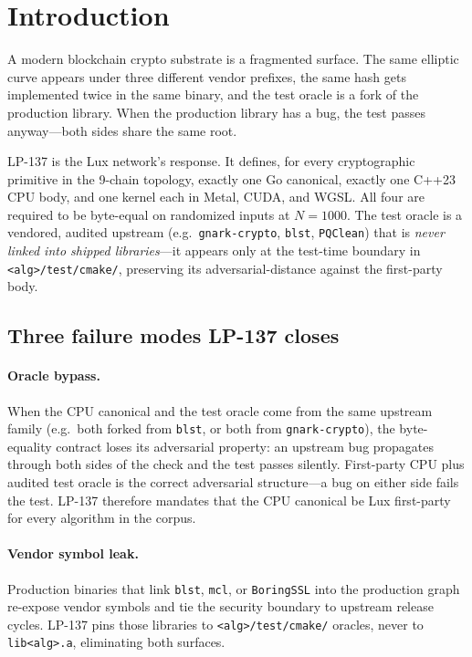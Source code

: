 \section{Introduction}
\label{sec:introduction}

A modern blockchain crypto substrate is a fragmented surface. The same elliptic curve appears under three different vendor prefixes, the same hash gets implemented twice in the same binary, and the test oracle is a fork of the production library. When the production library has a bug, the test passes anyway---both sides share the same root.

LP-137 is the Lux network's response. It defines, for every cryptographic primitive in the 9-chain topology, exactly one Go canonical, exactly one C++23 CPU body, and one kernel each in Metal, CUDA, and WGSL. All four are required to be byte-equal on randomized inputs at $N{=}1000$. The test oracle is a vendored, audited upstream (e.g.\ \texttt{gnark-crypto}, \texttt{blst}, \texttt{PQClean}) that is \emph{never linked into shipped libraries}---it appears only at the test-time boundary in \texttt{<alg>/test/cmake/}, preserving its adversarial-distance against the first-party body.

\subsection{Three failure modes LP-137 closes}

\paragraph{Oracle bypass.} When the CPU canonical and the test oracle come from the same upstream family (e.g.\ both forked from \texttt{blst}, or both from \texttt{gnark-crypto}), the byte-equality contract loses its adversarial property: an upstream bug propagates through both sides of the check and the test passes silently. First-party CPU plus audited test oracle is the correct adversarial structure---a bug on either side fails the test. LP-137 therefore mandates that the CPU canonical be Lux first-party for every algorithm in the corpus.

\paragraph{Vendor symbol leak.} Production binaries that link \texttt{blst}, \texttt{mcl}, or \texttt{BoringSSL} into the production graph re-expose vendor symbols and tie the security boundary to upstream release cycles. LP-137 pins those libraries to \texttt{<alg>/test/cmake/} oracles, never to \texttt{lib<alg>.a}, eliminating both surfaces.

